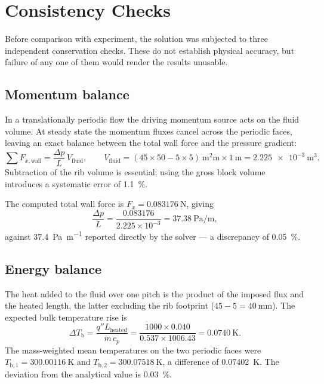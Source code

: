 \documentclass[11pt,a4paper]{article}
\newcommand{\Tb}{T_{\mathrm{b}}}
\begin{document}
\section{Consistency Checks}

Before comparison with experiment, the solution was subjected to three
independent conservation checks. These do not establish physical accuracy,
but failure of any one of them would render the results unusable.

\subsection{Momentum balance}

In a translationally periodic flow the driving momentum source acts on the
fluid volume. At steady state the momentum fluxes cancel across the periodic
faces, leaving an exact balance between the total wall force and the
pressure gradient:
\begin{equation}
  \sum F_{x,\text{wall}} = \frac{\Delta p}{L} \, V_{\text{fluid}},
  \qquad
  V_{\text{fluid}} = (45 \times 50 - 5 \times 5)\ \si{\square\milli\meter}
  \times \SI{1}{\meter} = \SI{2.225e-3}{\cubic\meter}.
  \label{eq:mombalance}
\end{equation}
Subtraction of the rib volume is essential; using the gross block volume
introduces a systematic error of \SI{1.1}{\percent}.

The computed total wall force is $F_{x} = \SI{0.083176}{\newton}$, giving
\begin{equation}
  \frac{\Delta p}{L} = \frac{0.083176}{2.225 \times 10^{-3}}
  = \SI{37.38}{\pascal\per\meter},
\end{equation}
against \SI{37.4}{\pascal\per\meter} reported directly by the solver ---
a discrepancy of \SI{0.05}{\percent}.

\subsection{Energy balance}

The heat added to the fluid over one pitch is the product of the imposed
flux and the heated length, the latter excluding the rib footprint
($45 - 5 = \SI{40}{\milli\meter}$). The expected bulk temperature rise is
\begin{equation}
  \Delta \Tb = \frac{q'' L_{\text{heated}}}{\dot{m}\,c_{p}}
  = \frac{1000 \times 0.040}{0.537 \times 1006.43}
  = \SI{0.0740}{\kelvin}.
\end{equation}
The mass-weighted mean temperatures on the two periodic faces were
$T_{\mathrm{b},1} = \SI{300.00116}{\kelvin}$ and
$T_{\mathrm{b},2} = \SI{300.07518}{\kelvin}$,
a difference of \SI{0.07402}{\kelvin}. The deviation from the analytical
value is \SI{0.03}{\percent}.
\end{document}

